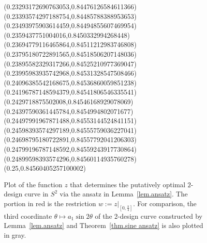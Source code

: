 \documentclass[12pt]{article}
\theoremstyle{plain}
\theoremstyle{definition}
\theoremstyle{remark}
\begin{document}
\begin{figure}
{  (0.23293172690763053,0.84476126584611366)%
  (0.23393574297188754,0.84485788388953653)%
  (0.23493975903614459,0.84494855607469954)%
  (0.2359437751004016,0.8450332994268448)%
  (0.23694779116465864,0.84511212983746808)%
  (0.23795180722891565,0.84518506207148036)%
  (0.23895582329317266,0.84525210977369047)%
  (0.23995983935742968,0.84531328547508466)%
  (0.24096385542168675,0.84536860059851238)%
  (0.24196787148594379,0.84541806546335541)%
  (0.2429718875502008,0.84546168929078069)%
  (0.24397590361445784,0.8454994802071677)%
  (0.24497991967871488,0.84553144524841151)%
  (0.24598393574297189,0.84555759036227041)%
  (0.24698795180722891,0.84557792041206303)%
  (0.24799196787148592,0.84559243917730864)%
  (0.24899598393574296,0.84560114935760278)%
  (0.25,0.84560405257100002)%
}


\centering
{}
\caption{Plot of the function $z$ that determines the putatively optimal $2$-design curve in $S^2$ via the ansatz in Lemma~\ref{lem.ansatz}. The portion in red is the restriction $w:=z|_{[0,\frac{\pi}{4}]}$. For comparison, the third coordinate $\theta\mapsto a_1\sin2\theta$ of the $2$-design curve constructed by Lemma~\ref{lem.ansatz} and Theorem~\ref{thm.sine ansatz} is also plotted in gray.}
\label{fig.z coord}
\end{figure}
\end{document}
